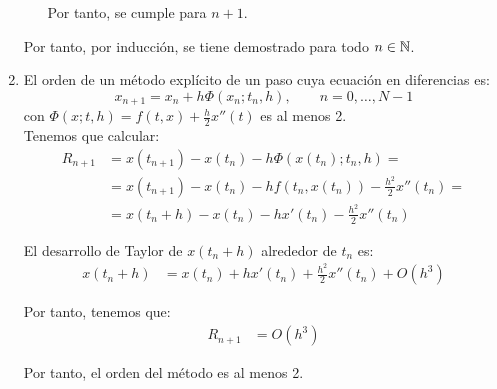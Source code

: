\begin{ejercicio}
\begin{enumerate}
\begin{itemize}
            Por tanto, se cumple para $n+1$.
        \end{itemize}

        Por tanto, por inducción, se tiene demostrado para todo $n \in \mathbb{N}$.
        \item El orden de un método explícito de un paso cuya ecuación en diferencias es:
        \begin{equation*}
            x_{n+1} = x_n + h \Phi(x_n; t_n, h),\qquad n = 0, \ldots, N-1
        \end{equation*}
        con $\Phi(x; t, h) = f(t, x) + \frac{h}{2} x''(t)$ es al menos 2.\\

        Tenemos que calcular:
        \begin{align*}
            R_{n+1} &= x(t_{n+1}) - x(t_n) -h \Phi(x(t_n); t_n, h)
            =\\&= x(t_{n+1}) - x(t_n) - h f(t_n, x(t_n)) - \frac{h^2}{2} x''(t_n) 
            =\\&= x(t_n + h) - x(t_n) - h x'(t_n) - \frac{h^2}{2} x''(t_n)
        \end{align*}

        El desarrollo de Taylor de $x(t_n + h)$ alrededor de $t_n$ es:
        \begin{align*}
            x(t_n + h) &= x(t_n) + h x'(t_n) + \frac{h^2}{2} x''(t_n) + O(h^3)
        \end{align*}

        Por tanto, tenemos que:
        \begin{align*}
            R_{n+1} &= O(h^3)
        \end{align*}

        Por tanto, el orden del método es al menos 2.
    \end{enumerate}
\end{ejercicio}

